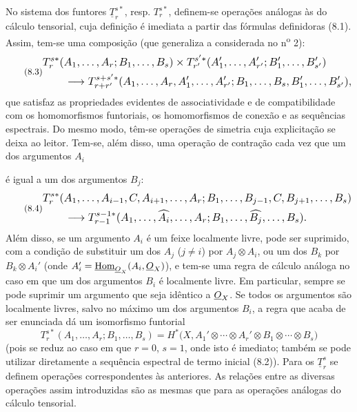 No sistema dos funtores $\underline{T}_{r}^{s*}$, resp.
$T_{r}^{s*}$, definem-se operações análogas às do cálculo tensorial, cuja
definição é imediata a partir das fórmulas definidoras (8.1). Assim, tem-se
uma composição (que generaliza a considerada no n\textsuperscript{o} 2):
\begin{equation}\tag{8.3}
\resizebox{\textwidth}{!}{$
\begin{aligned}
&T_{r}^{s*}(A_1,\ldots,A_r;B_1,\ldots,B_s)
\times T_{r'}^{s'*}(A'_1,\ldots,A'_{r'};B'_1,\ldots,B'_{s'})\\
&\qquad\longrightarrow
T_{r+r'}^{s+s'*}
(A_1,\ldots,A_r,A'_1,\ldots,A'_{r'};
 B_1,\ldots,B_s,B'_1,\ldots,B'_{s'}),
\end{aligned}
$}
\end{equation}
que satisfaz as propriedades evidentes de associatividade e de compatibilidade com
os homomorfismos funtoriais, os homomorfismos de conexão e as sequências
espectrais. Do mesmo modo, têm-se operações de simetria cuja explicitação se deixa ao
leitor. Tem-se, além disso, uma operação de contração cada vez que
um dos argumentos $A_i$

é igual a um dos argumentos $B_j$:
\begin{equation}\tag{8.4}
\resizebox{\textwidth}{!}{$
\begin{aligned}
&T_{r}^{s*}(A_1,\ldots,A_{i-1},C,A_{i+1},\ldots,A_r;
 B_1,\ldots,B_{j-1},C,B_{j+1},\ldots,B_s)\\
&\qquad\longrightarrow
T_{r-1}^{s-1*}(A_1,\ldots,\widehat{A_i},\ldots,A_r;
 B_1,\ldots,\widehat{B_j},\ldots,B_s).
\end{aligned}
$}
\end{equation}
Além disso, se um argumento $A_i$ é um feixe localmente livre, pode
ser suprimido, com a condição de substituir um dos $A_j$ ($j\neq i$) por
$A_j\otimes A_i$, ou um dos $B_k$ por $B_k\otimes A_i'$ (onde
$A_i'=\underline{\operatorname{Hom}}_{\underline{O}_X}(A_i,\underline{O}_X)$), e tem-se uma regra de cálculo análoga no
caso em que um dos argumentos $B_i$ é localmente livre. Em particular, sempre
se pode suprimir um argumento que seja idêntico a $\underline{O}_X$. Se todos os
argumentos são localmente livres, salvo no máximo um dos argumentos $B_i$, a regra
que acaba de ser enunciada dá um isomorfismo funtorial
\begin{equation}\tag{8.5}
  T_{r}^{s*}(A_1,\ldots,A_r;B_1,\ldots,B_s)
  =H^{*}\bigl(X,A_1'\otimes\cdots\otimes A_r'
    \otimes B_1\otimes\cdots\otimes B_s\bigr)
\end{equation}
(pois se reduz ao caso em que $r=0$, $s=1$, onde isto é imediato; também se
pode utilizar diretamente a sequência espectral de termo inicial (8.2)). Para os
$\underline{T}_{r}^{s}$ se definem operações correspondentes às anteriores.
As relações entre as diversas operações assim
introduzidas são as mesmas que para as operações análogas do cálculo
tensorial.

